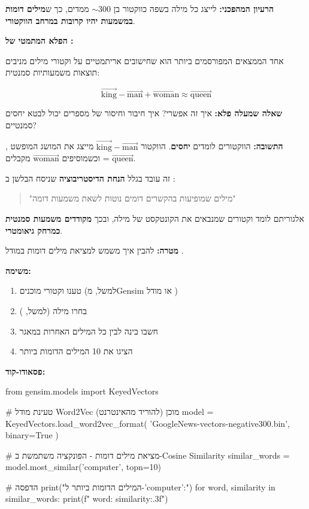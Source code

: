 \textbf{הרעיון המהפכני:} לייצג כל מילה בשפה כווקטור בן $\sim\num{300}$ ממדים, כך ש\textbf{מילים דומות במשמעות יהיו קרובות במרחב הווקטורי}.

\textbf{הפלא המתמטי של :}

אחד הממצאים המפורסמים ביותר הוא שחישובים אריתמטיים על וקטורי מילים מניבים תוצאות משמעותיות סמנטית:

\[
\vec{\text{king}} - \vec{\text{man}} + \vec{\text{woman}} \approx \vec{\text{queen}}
\]

\textbf{שאלה שמעלה פלא:} איך זה אפשרי? איך חיבור וחיסור של מספרים יכול לבטא יחסים סמנטיים?

\textbf{התשובה:} הווקטורים לומדים \textbf{יחסים}. הווקטור $\vec{\text{king}} - \vec{\text{man}}$ מייצג את המושג המופשט , וכשמוסיפים $\vec{\text{woman}}$ מקבלים  = $\vec{\text{queen}}$.

זה עובד בגלל \textbf{הנחת הדיסטריבוציה}  שניסח הבלשן  ב\en{-} \cite{harris1954}:

\begin{quote}
\textit{}

"מילים שמופיעות בהקשרים דומים נוטות לשאת משמעות דומה"
\end{quote}

אלגוריתם  לומד וקטורים שמנבאים את הקונטקסט של מילה, ובכך \textbf{מקודדים משמעות סמנטית כמרחק גיאומטרי}.


\textbf{מטרה:} להבין איך  משמש למציאת מילים דומות במודל .

\textbf{משימה:}
\begin{enumerate}
\item טענו וקטורי  מוכנים (למשל, מ\en{-}Gensim או מודל )
\item בחרו מילה (למשל, )
\item חשבו  בינה לבין כל המילים האחרות במאגר
\item הציגו את \num{10} המילים הדומות ביותר
\end{enumerate}

\textbf{פסאודו-קוד:}

\begin{pythonbox}
from gensim.models import KeyedVectors

# טעינת מודל Word2Vec מוכן (להוריד מהאינטרנט)
model = KeyedVectors.load_word2vec_format(
    'GoogleNews-vectors-negative300.bin', 
    binary=True
)

# מציאת מילים דומות - הפונקציה משתמשת ב-Cosine Similarity
similar_words = model.most_similar('computer', topn=10)

# הדפסה
print("המילים הדומות ביותר ל-'computer':")
for word, similarity in similar_words:
    print(f"  {word}: {similarity:.3f}")
\end{pythonbox}


